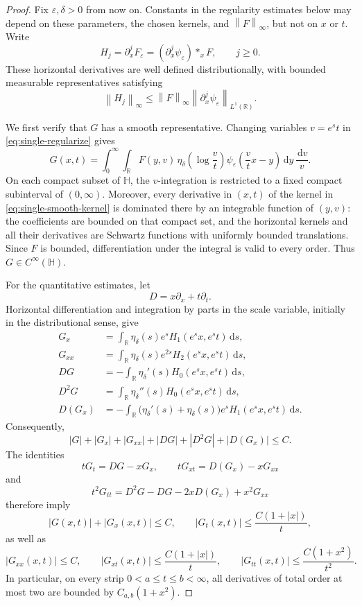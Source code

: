 \documentclass[12pt,a4paper]{article}
\theoremstyle{remark}
\newcommand{\dd}{\,\mathrm d}
\newcommand{\norm}[1]{\left\lVert#1\right\rVert}
\begin{document}
\begin{proof}
Fix $\varepsilon,\delta>0$ from now on. Constants in the
regularity estimates below may depend on these parameters,
the chosen kernels, and $\norm F_\infty$, but not on $x$ or $t$.
Write
\[
H_j=\partial_x^jF_\varepsilon
     =(\partial_x^j\psi_\varepsilon)*_xF,
\qquad j\ge0.
\]
These horizontal derivatives are well defined distributionally,
with bounded measurable representatives satisfying
\[
\norm{H_j}_\infty
\le \norm F_\infty
   \norm{\partial_x^j\psi_\varepsilon}_{L^1(\mathbb R)}.
\]

We first verify that $G$ has a smooth representative.
Changing variables $v=e^st$ in
\eqref{eq:single-regularize} gives
\begin{equation}\label{eq:single-smooth-kernel}
G(x,t)
=
\int_0^\infty\int_{\mathbb R}
F(y,v)\,
\eta_\delta\!\left(\log\frac vt\right)
\psi_\varepsilon\!\left(\frac vt x-y\right)
\dd y\,\frac{\dd v}{v}.
\end{equation}
On each compact subset of $\mathbb H$, the $v$-integration
is restricted to a fixed compact subinterval of $(0,\infty)$.
Moreover, every derivative in $(x,t)$ of the kernel in
\eqref{eq:single-smooth-kernel} is dominated there by an
integrable function of $(y,v)$: the coefficients are bounded
on that compact set, and the horizontal kernels and all their
derivatives are Schwartz functions with uniformly bounded
translations. Since $F$ is bounded, differentiation under the
integral is valid to every order. Thus $G\in C^\infty(\mathbb H)$.

For the quantitative estimates, let
\[
D=x\partial_x+t\partial_t.
\]
Horizontal differentiation and integration by parts in the
scale variable, initially in the distributional sense, give
\begin{align*}
G_x
&=\int_{\mathbb R}\eta_\delta(s)e^s
       H_1(e^sx,e^st)\dd s,\\
G_{xx}
&=\int_{\mathbb R}\eta_\delta(s)e^{2s}
       H_2(e^sx,e^st)\dd s,\\
DG
&=-\int_{\mathbb R}\eta_\delta'(s)
       H_0(e^sx,e^st)\dd s,\\
D^2G
&=\int_{\mathbb R}\eta_\delta''(s)
       H_0(e^sx,e^st)\dd s,\\
D(G_x)
&=-\int_{\mathbb R}
       \bigl(\eta_\delta'(s)+\eta_\delta(s)\bigr)e^s
       H_1(e^sx,e^st)\dd s.
\end{align*}
Consequently,
\[
|G|+|G_x|+|G_{xx}|+|DG|+|D^2G|+|D(G_x)|
\le C.
\]
The identities
\[
tG_t=DG-xG_x,\qquad
tG_{xt}=D(G_x)-xG_{xx}
\]
and
\[
t^2G_{tt}
=D^2G-DG-2xD(G_x)+x^2G_{xx}
\]
therefore imply
\begin{equation}\label{eq:single-derivatives}
|G(x,t)|+|G_x(x,t)|\le C,
\qquad
|G_t(x,t)|\le \frac{C(1+|x|)}{t},
\end{equation}
as well as
\begin{equation}\label{eq:single-second-derivatives}
|G_{xx}(x,t)|\le C,\qquad
|G_{xt}(x,t)|\le \frac{C(1+|x|)}{t},\qquad
|G_{tt}(x,t)|\le \frac{C(1+x^2)}{t^2}.
\end{equation}
In particular, on every strip $0<a\le t\le b<\infty$,
all derivatives of total order at most two are bounded by
$C_{a,b}(1+x^2)$.


\end{proof}
\end{document}
